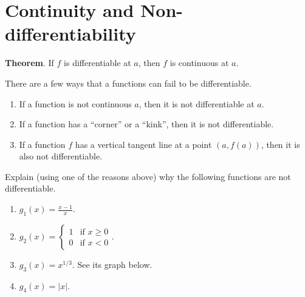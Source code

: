 \documentclass[../main.tex]{subfiles}
\begin{document}
\clearpage

\section{Continuity and Non-differentiability}

\begin{mdframed}[style=withref]
  \textbf{Theorem}. If \(f\) is {differentiable} at \(a\), then \(f\) is {continuous} at \(a\).

\end{mdframed}

There are a few ways that a functions can fail to be differentiable.
\begin{enumerate}[label=(\alph*)]
  \item If a function is not continuous \(a\), then it is not differentiable at \(a\).

  \item If a function has a ``corner'' or a ``kink'', then it is not differentiable. 

  \item If a function \(f\) has a vertical tangent line at a point \((a,f(a))\), then it is also not differentiable.
\end{enumerate}

\bigskip
\begin{example}
  Explain (using one of the reasons above) why the following functions are not differentiable.

  \begin{enumerate}
    \item \(g_{1}(x) = \frac{x - 1}{x}\). \vfill
    \item \(g_{2}(x) = \begin{cases} 1 &\text{if } x \ge 0 \\ 0 &\text{if } x < 0 \end{cases}\). \vfill
    \item \(g_{3}(x) = x^{1/3}\). See its graph below.

    \item \(g_{4}(x) = |x|\).  \vfill
  \end{enumerate}
\end{example}
\end{document}
